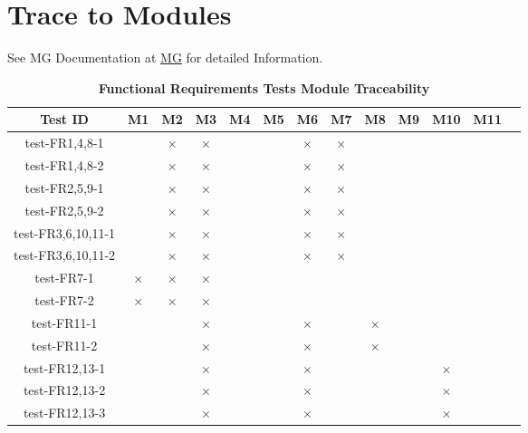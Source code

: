 \documentclass[12pt, titlepage]{article}
\begin{document}
\newpage
		
\section{Trace to Modules}

See MG Documentation at \href{https://github.com/PKALXI/RapidCare/blob/main/docs/Design/SoftArchitecture/MG.pdf} {MG} for detailed Information.\\

\begin{table}[H]
  \centering
  \begin{tabular}{|c|c|c|c|c|c|c|c|c|c|c|c|c|}
  \hline
  Test ID & M1 & M2 & M3 & M4 & M5 & M6 & M7 & M8 & M9 & M10 & M11 \\
  \hline
  test-FR1,4,8-1 & & $\times$ & $\times$ & & & $\times$ & $\times$ & & & & \\
  \hline
  test-FR1,4,8-2 & & $\times$ & $\times$ & & & $\times$ & $\times$ & & & & \\
  \hline
  test-FR2,5,9-1 & & $\times$ & $\times$ & & & $\times$ & $\times$ & & & & \\
  \hline
  test-FR2,5,9-2 & & $\times$ & $\times$ & & & $\times$ & $\times$ & & & & \\
  \hline
  test-FR3,6,10,11-1 & & $\times$ & $\times$ & & & $\times$ & $\times$ & & & & \\
  \hline
  test-FR3,6,10,11-2 & & $\times$ & $\times$ & & & $\times$ & $\times$ & & & & \\
  \hline
  test-FR7-1 & $\times$ & $\times$ & $\times$ & & & & & & & &\\
  \hline
  test-FR7-2 & $\times$ & $\times$ & $\times$ & & & & & & & & \\
  \hline
  test-FR11-1 & & & $\times$ & & & $\times$ & & $\times$ & & & \\
  \hline
  test-FR11-2 & & & $\times$ & & & $\times$ & & $\times$ & & & \\
  \hline
  test-FR12,13-1 & & & $\times$ & & & $\times$ & & & & $\times$ & \\
  \hline
  test-FR12,13-2 & & & $\times$ & & & $\times$ & & & & $\times$ & \\
  \hline
  test-FR12,13-3 & & & $\times$ & & & $\times$ & & & & $\times$ & \\
  \hline
\end{tabular}
\caption{\bf Functional Requirements Tests Module Traceability} \label{tab:fr-test-traceability}
\end{table}
\end{document}
